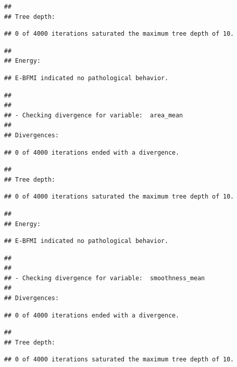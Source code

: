 \documentclass[
]{article}
\begin{document}
\begin{verbatim}
## 
## Tree depth:
\end{verbatim}

\begin{verbatim}
## 0 of 4000 iterations saturated the maximum tree depth of 10.
\end{verbatim}

\begin{verbatim}
## 
## Energy:
\end{verbatim}

\begin{verbatim}
## E-BFMI indicated no pathological behavior.
\end{verbatim}

\begin{verbatim}
## 
## 
## - Checking divergence for variable:  area_mean 
## 
## Divergences:
\end{verbatim}

\begin{verbatim}
## 0 of 4000 iterations ended with a divergence.
\end{verbatim}

\begin{verbatim}
## 
## Tree depth:
\end{verbatim}

\begin{verbatim}
## 0 of 4000 iterations saturated the maximum tree depth of 10.
\end{verbatim}

\begin{verbatim}
## 
## Energy:
\end{verbatim}

\begin{verbatim}
## E-BFMI indicated no pathological behavior.
\end{verbatim}

\begin{verbatim}
## 
## 
## - Checking divergence for variable:  smoothness_mean 
## 
## Divergences:
\end{verbatim}

\begin{verbatim}
## 0 of 4000 iterations ended with a divergence.
\end{verbatim}

\begin{verbatim}
## 
## Tree depth:
\end{verbatim}

\begin{verbatim}
## 0 of 4000 iterations saturated the maximum tree depth of 10.
\end{verbatim}
\end{document}
